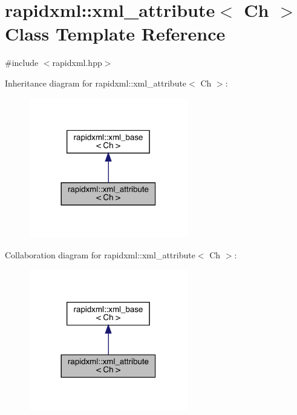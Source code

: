 \hypertarget{classrapidxml_1_1xml__attribute}{}\section{rapidxml\+::xml\+\_\+attribute$<$ Ch $>$ Class Template Reference}
\label{classrapidxml_1_1xml__attribute}


{\ttfamily \#include $<$rapidxml.\+hpp$>$}



Inheritance diagram for rapidxml\+::xml\+\_\+attribute$<$ Ch $>$\+:\nopagebreak
\begin{figure}[H]
\begin{center}
\leavevmode
\includegraphics[width=197pt]{classrapidxml_1_1xml__attribute__inherit__graph}
\end{center}
\end{figure}


Collaboration diagram for rapidxml\+::xml\+\_\+attribute$<$ Ch $>$\+:\nopagebreak
\begin{figure}[H]
\begin{center}
\leavevmode
\includegraphics[width=197pt]{classrapidxml_1_1xml__attribute__coll__graph}
\end{center}
\end{figure}
